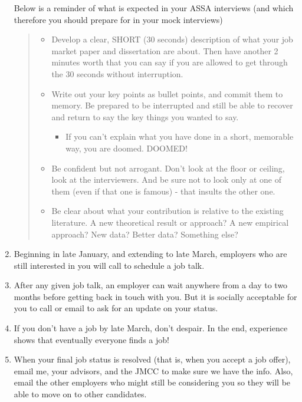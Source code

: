 \documentclass{\classes/econtex}
\begin{document}
\begin{enumerate}
  Below is a reminder of what is expected in your ASSA interviews (and which therefore you should prepare for in your mock interviews)
  \begin{quote}
    \begin{itemize}

    \item  Develop a clear, SHORT (30 seconds) description of what your job market paper and dissertation are about. Then have another 2 minutes worth that you can say if you are allowed to get through the 30 seconds without interruption.
    \item  Write out your key points as bullet points, and commit them to memory. Be prepared to be interrupted and still be able to recover and return to say the key things you wanted to say.
      \begin{itemize}
      \item If you can't explain what you have done in a short, memorable way, you are doomed. DOOMED!
      \end{itemize}
    \item  Be confident but not arrogant. Don't look at the floor or ceiling, look at the interviewers. And be sure not to look only at one of them (even if that one is famous) - that insults the other one.
    \item  Be clear about what your contribution is relative to the existing literature. A new theoretical result or approach? A new empirical approach? New data? Better data? Something else?
    \end{itemize}
  \end{quote}
  
  \hypertarget{Job-Talks-Scheduled}{}
\item Beginning in late January, and extending to late March,
  employers who are still interested in you will call to schedule a
  job talk.

  \hypertarget{How-Long-Will-It-Be}{}
\item After any given job talk, an employer can wait anywhere from a
  day to two months before getting back in touch with you.  But it is
  socially acceptable for you to call or email to ask for an update on
  your status.
  
  \hypertarget{Dont-Despair}{}
\item If you don't have a job by late March, don't despair.  In the
  end, experience shows that eventually everyone finds a job!

  \hypertarget{Report-Outcome}{}
\item When your final job status is resolved (that is, when you accept 
  a job offer), email me, your advisors, and the JMCC to make sure we have the info.
  Also, email the other employers who might still be considering you so they will be able to move on to other candidates.
  

\end{enumerate}
\end{document}
